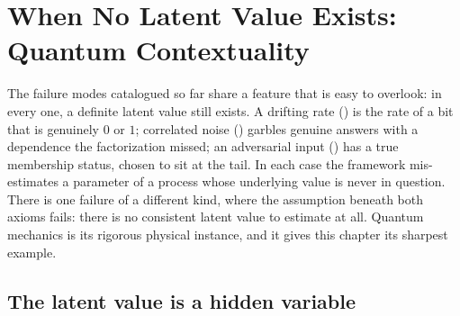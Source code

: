 %

\section[No Latent Value: Quantum Contextuality]{When No Latent Value Exists: Quantum Contextuality}
\label{sec:quantum-contextuality}

The failure modes catalogued so far share a feature that is easy to
overlook: in every one, a definite latent value still exists. A drifting
rate () is the rate of a bit that is genuinely
$0$ or $1$; correlated noise () garbles
genuine answers with a dependence the factorization missed; an
adversarial input () has a true membership
status, chosen to sit at the tail. In each case the framework
mis-estimates a parameter of a process whose underlying value is never in
question. There is one failure of a different kind, where the assumption
beneath both axioms fails: there is no consistent latent value to
estimate at all. Quantum mechanics is its rigorous physical instance, and
it gives this chapter its sharpest example.

\subsection*{The latent value is a hidden variable}


